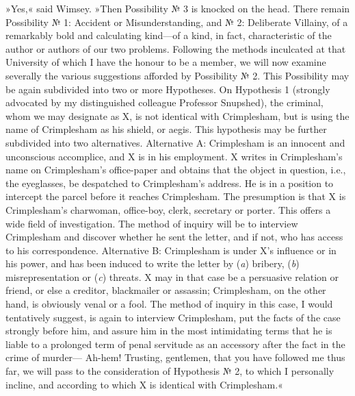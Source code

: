 »Yes,« said Wimsey. »Then Possibility № 3 is knocked on the head. There remain Possibility № 1: Accident or Misunderstanding, and № 2: Deliberate Villainy, of a remarkably bold and calculating kind—of a kind, in fact, characteristic of the author or authors of our two problems. Following the methods inculcated at that University of which I have the honour to be a member, we will now examine severally the various suggestions afforded by Possibility № 2. This Possibility may be again subdivided into two or more Hypotheses. On Hypothesis 1 (strongly advocated by my distinguished colleague Professor Snupshed), the criminal, whom we may designate as X, is not identical with Crimplesham, but is using the name of Crimplesham as his shield, or aegis. This hypothesis may be further subdivided into two alternatives. Alternative A: Crimplesham is an innocent and unconscious accomplice, and X is in his employment. X writes in Crimplesham's name on Crimplesham's office-paper and obtains that the object in question, i.e., the eyeglasses, be despatched to Crimplesham's address. He is in a position to intercept the parcel before it reaches Crimplesham. The presumption is that X is Crimplesham's charwoman, office-boy, clerk, secretary or porter. This offers a wide field of investigation. The method of inquiry will be to interview Crimplesham and discover whether he sent the letter, and if not, who has access to his correspondence. Alternative B: Crimplesham is under X's influence or in his power, and has been induced to write the letter by (\textit{a}) bribery, (\textit{b}) misrepresentation or (\textit{c}) threats. X may in that case be a persuasive relation or friend, or else a creditor, blackmailer or assassin; Crimplesham, on the other hand, is obviously venal or a fool. The method of inquiry in this case, I would tentatively suggest, is again to interview Crimplesham, put the facts of the case strongly before him, and assure him in the most intimidating terms that he is liable to a prolonged term of penal servitude as an accessory after the fact in the crime of murder— Ah-hem! Trusting, gentlemen, that you have followed me thus far, we will pass to the consideration of Hypothesis № 2, to which I personally incline, and according to which X is identical with Crimplesham.«

